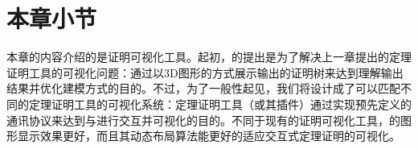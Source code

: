 \section{本章小节}
本章的内容介绍的是证明可视化工具。起初，的提出是为了解决上一章提出的定理证明工具\sctlprov{}的可视化问题：通过以3D图形的方式展示\sctlprov{}输出的证明树来达到理解输出结果并优化建模方式的目的。不过，为了一般性起见，我们将设计成了可以匹配不同的定理证明工具的可视化系统：定理证明工具（或其插件）通过实现预先定义的通讯协议来达到与进行交互并可视化的目的。不同于现有的证明可视化工具，的图形显示效果更好，而且其动态布局算法能更好的适应交互式定理证明的可视化。
